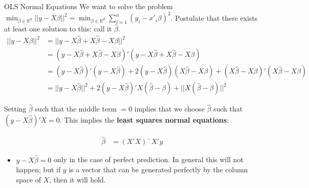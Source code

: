 \documentclass[fleqn, 10pt]{beamer}
\begin{document}
\begin{frame}{OLS Normal Equations}
	We want to solve the problem $\min_{\beta\in \mathbb{R}^d}||y-X\beta||^2 = \min_{\beta\in \mathbb{R}^d}\sum^n_{i=1}(y_i-x'_i\beta)^2$. Postulate that there exists at least one solution to this: call it $\hat{\beta}$.
	\begin{align*}
	||y-X\beta||^2&= ||y-X\hat{\beta}+X\hat{\beta}-X\beta||^2 \\
	&=(y-X\hat{\beta}+X\hat{\beta}-X\beta)'(y-X\hat{\beta}+X\hat{\beta}-X\beta) \\
	&= (y-X\hat{\beta})'(y-X\hat{\beta})+2(y-X\hat{\beta})(X\hat{\beta}-X\beta)+(X\hat{\beta}-X\beta)'(X\hat{\beta}-X\beta) \\
	&=||y-X\hat{\beta}||^2+2(y-X\hat{\beta})'X(\hat{\beta}-\beta)+||X(\hat{\beta}-\beta)||^2
	\end{align*}
	
	Setting $\hat{\beta}$ such that the middle term $=0$ implies that we choose $\hat{\beta}$ such that $(y-X\hat{\beta})'X=0 $. This implies the \textbf{least squares normal equations}:

	\begin{align*}
	\hat{\beta}&=(X'X)^-X'y
	\end{align*}
	
	\begin{itemize}
		\item $y-X\hat{\beta}=0$ only in the case of perfect prediction. In general this will not happen; but if $y$ is a vector that can be generated perfectly by the column space of $X$, then it will hold.
	\end{itemize}
\end{frame}
\end{document}
